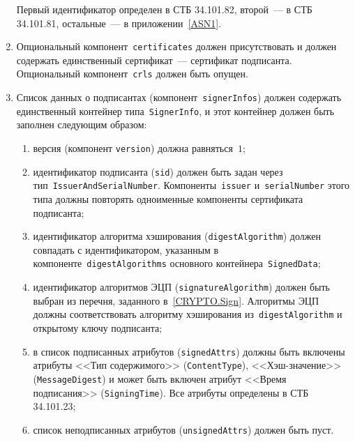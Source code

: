 \begin{enumerate}
Первый идентификатор определен в СТБ 34.101.82, второй~--- в СТБ 
34.101.81, остальные~--- в приложении~\ref{ASN1}.

\item
Опциональный компонент~\texttt{certificates} должен присутствовать и 
должен содержать единственный сертификат~--- сертификат подписанта.
%
Опциональный компонент~\texttt{crls} должен быть опущен.

\item
Список данных о подписантах (компонент~\texttt{signerInfos}) должен 
содержать единственный контейнер типа~\texttt{SignerInfo}, и этот 
контейнер должен быть заполнен следующим образом: 
\begin{enumerate}
\item
версия (компонент \texttt{version}) должна равняться~$1$;
\item
идентификатор подписанта (\texttt{sid}) должен быть задан через
тип~\texttt{IssuerAndSerialNumber}. Компоненты~\texttt{issuer} 
и~\texttt{serialNumber} этого типа должны повторять одноименные компоненты 
сертификата подписанта;
\item
идентификатор алгоритма хэширования (\texttt{digestAlgorithm}) должен 
совпадать с идентификатором, указанным в 
компоненте~\texttt{digestAlgorithms} основного  
контейнера~\texttt{SignedData};
\item
идентификатор алгоритмов ЭЦП (\texttt{signatureAlgorithm}) должен 
быть выбран из перечня, заданного в~\ref{CRYPTO.Sign}. 
Алгоритмы ЭЦП должны соответствовать алгоритму хэширования
из~\texttt{digestAlgorithm} и открытому ключу подписанта;
\item
в список подписанных атрибутов (\texttt{signedAttrs}) должны 
быть включены атрибуты <<Тип содержимого>> (\texttt{ContentType}),
<<Хэш-значение>> (\texttt{MessageDigest}) и может быть включен
атрибут <<Время подписания>> (\texttt{SigningTime}). 
Все атрибуты определены в СТБ 34.101.23;
\item
список неподписанных атрибутов (\texttt{unsignedAttrs}) должен быть пуст.
\end{enumerate}
\end{enumerate}
